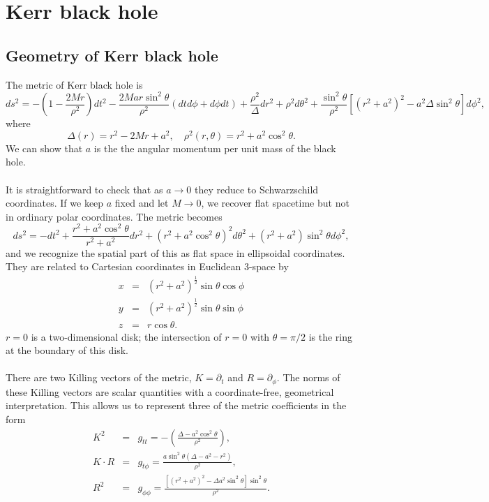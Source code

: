 \documentclass[cyan]{elegantnote}
\begin{document}
\section{Kerr black hole}
\subsection{Geometry of Kerr black hole}
The metric of Kerr black hole is
\[ds^2 = -\left(1 - \frac{2Mr}{\rho^2}\right)dt^2 - \frac{2Mar\sin^2\theta}{\rho^2}(dt d\phi + d\phi dt) + \frac{\rho^2}{\Delta} dr^2 + \rho^2d\theta^2 + \frac{\sin^2\theta}{\rho^2} \left[(r^2+a^2)^2 - a^2 \Delta \sin^2\theta\right]d\phi^2,\]
where
\[\Delta(r) = r^2 - 2Mr + a^2, \quad \rho^2(r,\theta) = r^2 + a^2 \cos^2\theta.\]
We can show that $a$ is the the angular momentum per unit mass of the black hole.
\\ \\
It is straightforward to check that as $a \to 0$ they reduce to Schwarzschild coordinates.
If we keep $a$ fixed and let $M \to 0$, we recover flat spacetime but not in ordinary polar coordinates. 
The metric becomes
\[ds^2 = -dt^2 + \frac{r^2+a^2\cos^2\theta}{r^2 + a^2} dr^2 + (r^2 + a^2\cos^2\theta)^2d\theta^2 + (r^2+a^2)\sin^2\theta d\phi^2,\]
and we recognize the spatial part of this as flat space in ellipsoidal coordinates. 
They are related to Cartesian coordinates in Euclidean $3$-space by
\begin{eqnarray}
x &=& (r^2+a^2)^{\frac{1}{2}} \sin\theta \cos\phi \nonumber \\
y &=& (r^2+a^2)^{\frac{1}{2}} \sin\theta \sin\phi \nonumber \\
z &=& r\cos\theta. \nonumber
\end{eqnarray}
$r = 0$ is a two-dimensional disk; the intersection of $r = 0$ with $\theta = \pi / 2$ is the ring at the boundary of this disk.
\\ \\
There are two Killing vectors of the metric, $K = \partial_t$ and $R = \partial_{\phi}$. The norms of these Killing vectors are scalar quantities with a coordinate-free, geometrical interpretation. 
This allows us to represent three of the metric coefficients in the form
\begin{eqnarray}
K^2 &=& g_{tt} = -\left( \frac{\Delta - a^2\cos^2\theta}{\rho^2} \right), \nonumber \\
K\cdot R &=& g_{t\phi} = \frac{a\sin^2\theta(\Delta - a^2 - r^2)}{\rho^2}, \nonumber \\
R^2 &=& g_{\phi\phi} = \frac{[(r^2+a^2)^2-\Delta a^2\sin^2\theta]\sin^2\theta}{\rho^2}. \nonumber
\end{eqnarray}
\end{document}
